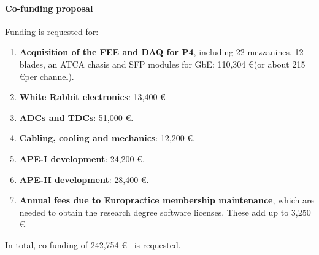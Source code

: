 \paragraph{Co-funding proposal}
Funding is requested for:

\begin{enumerate}
\item {\bf Acquisition of the FEE and DAQ for P4}, including 22 mezzanines, 12 blades, an ATCA chasis and SFP modules for GbE:   110,304 \euro (or about 215 \euro per channel).
\item {\bf White Rabbit electronics}: 13,400 \euro
\item {\bf ADCs and TDCs}: 51,000 \euro.
\item {\bf Cabling, cooling and mechanics}: 12,200 \euro.
\item {\bf APE-I development}: 24,200 \euro.
\item {\bf APE-II development}: 28,400 \euro.
\item {\bf Annual fees due to Europractice membership maintenance}, which are needed to obtain the  research degree software licenses. These add up to 3,250 \euro.
\end{enumerate}

In total, co-funding of 242,754 \euro~ is requested. 
